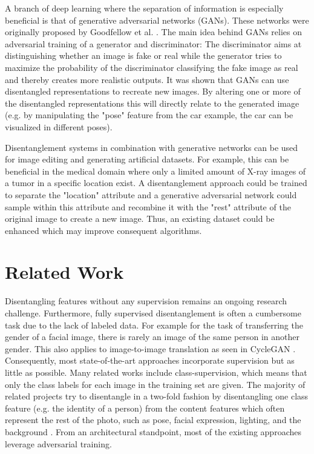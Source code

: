 \documentclass[conference]{IEEEtran}
\begin{document}
A branch of deep learning where the separation of information is especially beneficial is that of generative adversarial networks (GANs). These networks were originally proposed by Goodfellow et al. \cite{goodfellow2014generative}. The main idea behind GANs relies on adversarial training of a generator and discriminator: The discriminator aims at distinguishing whether an image is fake or real while the generator tries to maximize the probability of the discriminator classifying the fake image as real and thereby creates more realistic outputs. It was shown that GANs can use disentangled representations to recreate new images. By altering one or more of the disentangled representations this will directly relate to the generated image (e.g. by manipulating the "pose" feature from the car example, the car can be visualized in different poses). 

Disentanglement systems in combination with generative networks can be used for image editing and generating artificial datasets. For example, this can be beneficial in the medical domain where only a limited amount of X-ray images of a tumor in a specific location exist. A disentanglement approach could be trained to separate the "location" attribute and a generative adversarial network could sample within this attribute and recombine it with the "rest" attribute of the original image to create a new image. Thus, an existing dataset could be enhanced which may improve consequent algorithms. 

\label{chap2_related_work}
\section{Related Work}

Disentangling features without any supervision remains an ongoing research challenge. Furthermore, fully supervised disentanglement is often a cumbersome task due to the lack of labeled data. For example for the task of transferring the gender of a facial image, there is rarely an image of the same person in another gender. This also applies to image-to-image translation as seen in CycleGAN \cite{zhu2017unpaired}. Consequently, most state-of-the-art approaches incorporate supervision but as little as possible. Many related works include class-supervision, which means that only the class labels for each image in the training set are given. The majority of related projects try to disentangle in a two-fold fashion by disentangling one class feature (e.g. the identity of a person) from the content features which often represent the rest of the photo, such as pose, facial expression, lighting, and the background \cite{nitzan2020disentangling} \cite{liu2019few} \cite{mokady2019mask}. 
From an architectural standpoint, most of the existing approaches leverage adversarial training.
\end{document}
